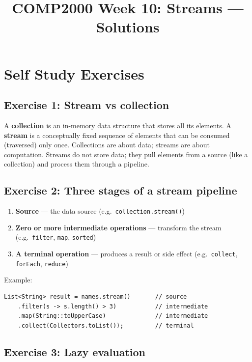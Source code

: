 \documentclass[twoside=false,DIV=14]{scrartcl}
\title{\color{redish} \vspace{-1em}COMP2000 Week 10: Streams --- Solutions}
\begin{document}
{\color{blackish}\maketitle}\vspace{-7em}

\section*{Self Study Exercises}

\subsection*{Exercise 1: Stream vs collection}

A \textbf{collection} is an in-memory data structure that stores all its elements.  A \textbf{stream} is a conceptually fixed sequence of elements that can be consumed (traversed) only once.  Collections are about data; streams are about computation.  Streams do not store data; they pull elements from a source (like a collection) and process them through a pipeline.

\subsection*{Exercise 2: Three stages of a stream pipeline}

\begin{enumerate}
    \item \textbf{Source} --- the data source (e.g.\ \texttt{collection.stream()})
    \item \textbf{Zero or more intermediate operations} --- transform the stream (e.g.\ \texttt{filter}, \texttt{map}, \texttt{sorted})
    \item \textbf{A terminal operation} --- produces a result or side effect (e.g.\ \texttt{collect}, \texttt{forEach}, \texttt{reduce})
\end{enumerate}

Example:
\begin{lstlisting}
List<String> result = names.stream()       // source
    .filter(s -> s.length() > 3)           // intermediate
    .map(String::toUpperCase)              // intermediate
    .collect(Collectors.toList());         // terminal
\end{lstlisting}

\subsection*{Exercise 3: Lazy evaluation}
\end{document}
